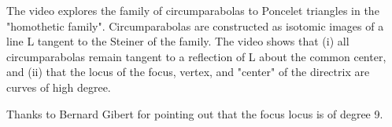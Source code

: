 The video explores the family of circumparabolas to Poncelet triangles in the "homothetic family". Circumparabolas are constructed as isotomic images of a line L tangent to the Steiner of the family. The video shows that (i)  all circumparabolas remain tangent to a reflection of L about the common center, and (ii) that the locus of the focus, vertex, and "center" of the directrix are curves of high degree.

Thanks to Bernard Gibert for pointing out that the focus locus is of degree 9.